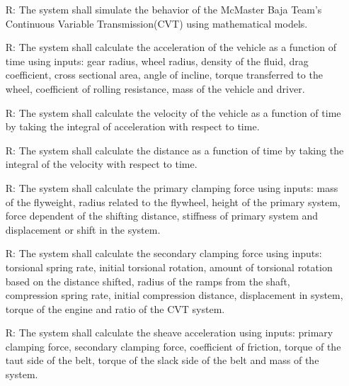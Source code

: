 \documentclass[12pt]{article}
\newcounter{reqnum} %
\begin{document}
\noindent \begin{itemize}

\item[R\refstepcounter{reqnum}\thereqnum \label{R_1}:] The system shall simulate the behavior of the McMaster Baja Team's Continuous Variable Transmission(CVT) using mathematical models.

\item[R\refstepcounter{reqnum}\thereqnum \label{R_2}:] The system shall calculate the acceleration of the vehicle as a function of time using inputs: gear radius, wheel radius, density of the fluid, drag coefficient, cross sectional area, angle of incline, torque transferred to the wheel, coefficient of rolling resistance, mass of the vehicle and driver. 

\item[R\refstepcounter{reqnum}\thereqnum \label{R_3}:] The system shall calculate the velocity of the vehicle as a function of time by taking the integral of acceleration with respect to time.

\item[R\refstepcounter{reqnum}\thereqnum \label{R_4}:] The system shall calculate the distance as a function of time by taking the integral of the velocity with respect to time.

\item[R\refstepcounter{reqnum}\thereqnum \label{R_5}:] The system shall calculate the primary clamping force using inputs: mass of the flyweight, radius related to the flywheel, height of the primary system, force dependent of the shifting distance, stiffness of primary system and displacement or shift in the system. 

\item[R\refstepcounter{reqnum}\thereqnum \label{R_6}:] The system shall calculate the secondary clamping force using inputs: torsional spring rate, initial torsional rotation, amount of torsional rotation based on the distance shifted, radius of the ramps from the shaft, compression spring rate, initial compression distance, displacement in system, torque of the engine and ratio of the CVT system.

\item[R\refstepcounter{reqnum}\thereqnum \label{R_7}:] The system shall calculate the sheave acceleration using inputs: primary clamping force, secondary clamping force, coefficient of friction, torque of the taut side of the belt, torque of the slack side of the belt and mass of the system. 


\end{itemize}
\end{document}
